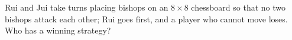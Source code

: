 Rui and Jui take turns placing bishops on an $8\times8$ chessboard so that no two bishops attack each other; Rui goes first, and a player who cannot move loses. Who has a winning strategy?
